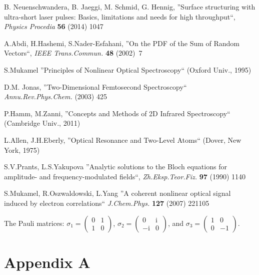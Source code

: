 \documentclass[prb,twocolumn,showpacs,epsfig,epsf]{revtex4}
\renewcommand{\i}{\mathrm{i}}
\newcommand{\1}{\mathds{1}}
\begin{document}
\begin{thebibliography}{99}
 B. Neuenschwandera, B. Jaeggi, M. Schmid, G. Hennig, ''Surface structuring with ultra-short laser pulses: Basics, limitations and needs for high throughput``, {\it Physics Procedia} {\bf 56} (2014) 1047

 A.Abdi, H.Hashemi, S.Nader-Esfahani, ''On the PDF of the Sum of Random Vectors``, {\it IEEE Trans.Commun.} {\bf 48} (2002)~7

 S.Mukamel ''Principles of Nonlinear Optical Spectroscopy`` (Oxford Univ., 1995)

 D.M. Jonas, ''Two-Dimensional Femtosecond Spectroscopy`` {\it Annu.Rev.Phys.Chem.} (2003) 425

 P.Hamm, M.Zanni, ''Concepts and Methods of 2D Infrared Spectroscopy`` (Cambridge Univ., 2011)

 L.Allen, J.H.Eberly, ''Optical Resonance and Two-Level Atoms`` (Dover, New York, 1975)

 S.V.Prants, L.S.Yakupova ''Analytic solutions to the Bloch equations for amplitude- and frequency-modulated fields``, {\it Zh.Eksp.Teor.Fiz.} {\bf 97} (1990) 1140

 S.Mukamel, R.Oszwaldowski, L.Yang ''A coherent nonlinear optical signal induced by electron correlations`` {\it J.Chem.Phys.} {\bf 127} (2007) 221105

 The Pauli matrices:
$
\sigma_1=\left(\begin{matrix}
0&1\\
1&0
\end{matrix}\right)$, $
\sigma_2=\left(\begin{matrix}
0&\i\\
-\i&0
\end{matrix}\right)$, and $\sigma_3=\left(\begin{matrix}
1&0\\
0&-1
\end{matrix}\right)$.
\end{thebibliography}

\newpage
\section*{Appendix A}
\end{document}
